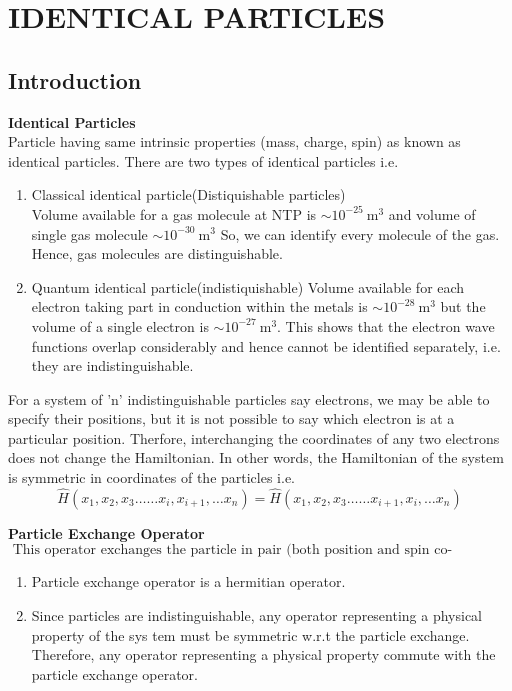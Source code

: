\chapter{IDENTICAL PARTICLES}
\section{Introduction}
\textbf{Identical Particles}\\
Particle having same intrinsic properties (mass, charge, spin) as known as identical particles. There are two types of identical particles i.e.
\begin{enumerate}
	\item Classical identical particle(Distiquishable particles)\\
	Volume available for a gas molecule at NTP is $\sim 10^{-25} \mathrm{~m}^{3}$ and volume of single gas molecule $\sim 10^{-30} \mathrm{~m}^{3}$ So, we can identify every molecule of the gas. Hence, gas molecules are distinguishable.
	\item Quantum identical particle(indistiquishable)
	Volume available for each electron taking part in conduction within the metals is $\sim 10^{-28} \mathrm{~m}^{3}$ but the volume of a single electron is $\sim 10^{-27} \mathrm{~m}^{3}$. This shows that the electron wave functions overlap considerably and hence cannot be identified separately, i.e. they are indistinguishable.
\end{enumerate}
\begin{note}
	For a system of 'n' indistinguishable particles say electrons, we may be able to specify their positions, but it is not possible to say which electron is at a particular position. Therfore, interchanging the coordinates of any two electrons does not change the Hamiltonian. In other words, the Hamiltonian of the system is symmetric in coordinates of the particles i.e.
	$$
	\hat{H}\left(x_{1}, x_{2}, x_{3} \ldots \ldots x_{i}, x_{i+1}, \ldots x_{n}\right)=\hat{H}\left(x_{1}, x_{2}, x_{3} \ldots \ldots x_{i+1}, x_{i}, \ldots x_{n}\right)
	$$
	\end{note}
\textbf{Particle Exchange Operator}\\
$\text { This operator exchanges the particle in pair (both position and spin co-ordinates). }$
\begin{note}
	\begin{enumerate}[label=\roman*)]
			\item  Particle exchange operator is a hermitian operator. \\
	\item  Since particles are indistinguishable, any operator representing a physical property of the sys tem must be symmetric w.r.t the particle exchange. Therefore, any operator representing a physical property commute with the particle exchange operator.
	\end{enumerate}
\end{note}
